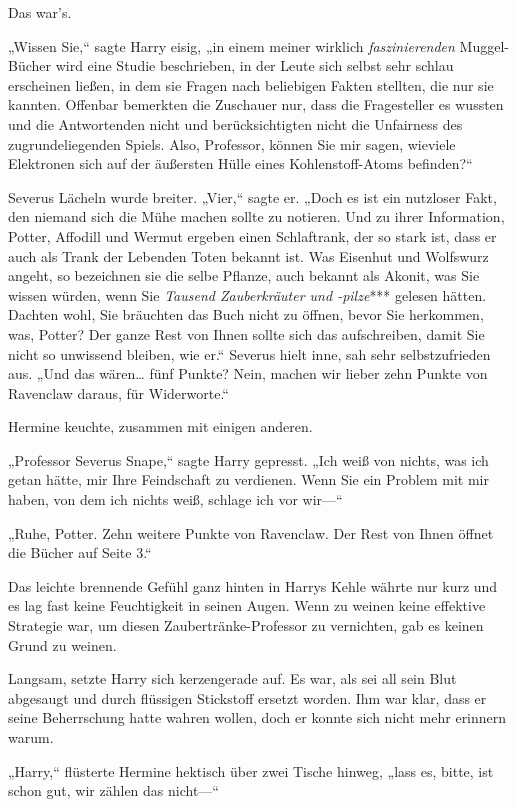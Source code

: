{Das war's.

„Wissen Sie,“ sagte Harry eisig, „in einem meiner wirklich \emph{faszinierenden} Muggel-Bücher wird eine Studie beschrieben, in der Leute sich selbst sehr schlau erscheinen ließen, in dem sie Fragen nach beliebigen Fakten stellten, die nur sie kannten. Offenbar bemerkten die Zuschauer nur, dass die Fragesteller es wussten und die Antwortenden nicht und berücksichtigten nicht die Unfairness des zugrundeliegenden Spiels. Also, Professor, können Sie mir sagen, wieviele Elektronen sich auf der äußersten Hülle eines Kohlenstoff-Atoms befinden?“

Severus Lächeln wurde breiter. „Vier,“ sagte er. „Doch es ist ein nutzloser Fakt, den niemand sich die Mühe machen sollte zu notieren. Und zu ihrer Information, Potter, Affodill und Wermut ergeben einen Schlaftrank, der so stark ist, dass er auch als Trank der Lebenden Toten bekannt ist. Was Eisenhut und Wolfswurz angeht, so bezeichnen sie die selbe Pflanze, auch bekannt als Akonit, was Sie wissen würden, wenn Sie \emph{Tausend Zauberkräuter und -pilze}*** gelesen hätten. Dachten wohl, Sie bräuchten das Buch nicht zu öffnen, bevor Sie herkommen, was, Potter? Der ganze Rest von Ihnen sollte sich das aufschreiben, damit Sie nicht so unwissend bleiben, wie er.“ Severus hielt inne, sah sehr selbstzufrieden aus. „Und das wären… fünf Punkte? Nein, machen wir lieber zehn Punkte von Ravenclaw daraus, für Widerworte.“

Hermine keuchte, zusammen mit einigen anderen.

„Professor Severus Snape,“ sagte Harry gepresst. „Ich weiß von nichts, was ich getan hätte, mir Ihre Feindschaft zu verdienen. Wenn Sie ein Problem mit mir haben, von dem ich nichts weiß, schlage ich vor wir—“

„Ruhe, Potter. Zehn weitere Punkte von Ravenclaw. Der Rest von Ihnen öffnet die Bücher auf Seite 3.“

Das leichte brennende Gefühl ganz hinten in Harrys Kehle währte nur kurz und es lag fast keine Feuchtigkeit in seinen Augen. Wenn zu weinen keine effektive Strategie war, um diesen Zaubertränke-Professor zu vernichten, gab es keinen Grund zu weinen.

Langsam, setzte Harry sich kerzengerade auf. Es war, als sei all sein Blut abgesaugt und durch flüssigen Stickstoff ersetzt worden. Ihm war klar, dass er seine Beherrschung hatte wahren wollen, doch er konnte sich nicht mehr erinnern warum.

„Harry,“ flüsterte Hermine hektisch über zwei Tische hinweg, „lass es, bitte, ist schon gut, wir zählen das nicht—“

}
